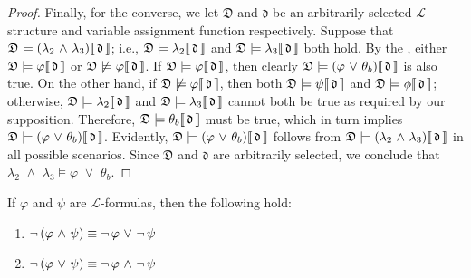 \begin{proof}
    \vspace{0.3cm}
    \noindent
    Finally, for the converse, we let \( \mathfrak{D} \) and \( \mathfrak{d} \) be an arbitrarily selected \( \mathcal{L} \)-structure
    and variable assignment function respectively.
    Suppose that \( \folwffsatisfaction{\mathfrak{D}}{\mleft( \lambda_{2} \,\,{\land}\,\, \lambda_{3} \mright)}{\mathfrak{d}} \);
    i.e., \(  \mathfrak{D} \models \lambda_{2}\llbracket\, \mathfrak{d} \,\rrbracket \) and \(  \mathfrak{D} \models \lambda_{3}\llbracket\, \mathfrak{d} \,\rrbracket \)
    both hold. By the , either
    \(  \mathfrak{D} \models \varphi\llbracket\, \mathfrak{d} \,\rrbracket \) or \(  \mathfrak{D} \not\models \varphi\llbracket\,\mathfrak{d} \,\rrbracket \).
    If \(  \mathfrak{D} \models \varphi\llbracket\, \mathfrak{d} \,\rrbracket \), then clearly
    \( \folwffsatisfaction{\mathfrak{D}}{\mleft( \varphi \,\,{\lor}\,\, \theta_{b} \mright)}{\mathfrak{d}} \) is also true.
    On the other hand, if \(  \mathfrak{D} \not\models \varphi\llbracket\,\mathfrak{d} \,\rrbracket \), then both
    \(  \mathfrak{D} \models \psi\llbracket\, \mathfrak{d} \,\rrbracket \) and \(  \mathfrak{D} \models \phi\llbracket\, \mathfrak{d} \,\rrbracket \);
    otherwise, \(  \mathfrak{D} \models \lambda_{2}\llbracket\, \mathfrak{d} \,\rrbracket \) and \(  \mathfrak{D} \models \lambda_{3}\llbracket\, \mathfrak{d} \,\rrbracket \)
    cannot both be true as required by our supposition.
    Therefore, \(  \mathfrak{D} \models \theta_{b}\llbracket\, \mathfrak{d} \,\rrbracket \) must be true,
    which in turn implies \( \folwffsatisfaction{\mathfrak{D}}{\mleft( \varphi \,\,{\lor}\,\, \theta_{b} \mright)}{\mathfrak{d}} \).
    Evidently, \( \folwffsatisfaction{\mathfrak{D}}{\mleft( \varphi \,\,{\lor}\,\, \theta_{b} \mright)}{\mathfrak{d}} \) follows from
    \( \folwffsatisfaction{\mathfrak{D}}{\mleft( \lambda_{2} \,\,{\land}\,\, \lambda_{3} \mright)}{\mathfrak{d}} \) in all possible scenarios.
    Since \( \mathfrak{D} \) and \( \mathfrak{d} \) are arbitrarily selected, we conclude that
    \( \lambda_{2} \,\,{\land}\,\, \lambda_{3} \models \varphi \,\,{\lor}\,\, \theta_{b} \).
\end{proof}

\begin{thm}
     \label{logical-equivalence:de-morgans-laws}
    If \( \varphi \) and \( \psi \) are \( \mathcal{L} \)-formulas, then the following hold:
    \begin{enumerate}[topsep=2pt,label=\textup{\texttt{(\alph*)}}]
        \item \( \lnot \, \mleft( \varphi \,\,{\land}\,\, \psi \mright) \equiv \lnot \, \varphi \,\,{\lor}\,\, \lnot \, \psi \)
             \label{enum:de-morgan-conjunct-to-disjunct}
        \item \( \lnot \, \mleft( \varphi \,\,{\lor}\,\, \psi \mright) \equiv \lnot \, \varphi \,\,{\land}\,\, \lnot \, \psi \)
             \label{enum:de-morgan-disjunct-to-conjunct}
    \end{enumerate}
\end{thm}

